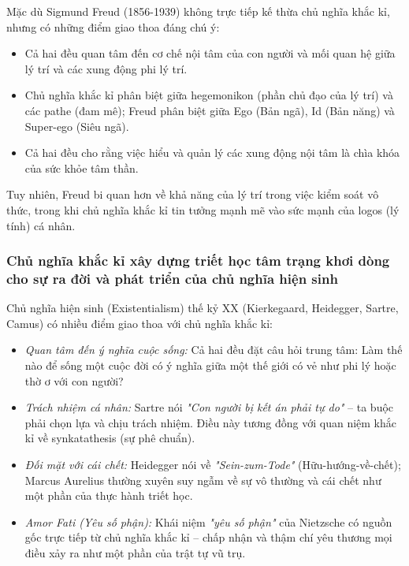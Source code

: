 Mặc dù Sigmund Freud (1856-1939) không trực tiếp kế thừa chủ nghĩa khắc kỉ, nhưng có những điểm giao thoa đáng chú ý:

\begin{itemize}[leftmargin=1.5cm]
    \item Cả hai đều quan tâm đến cơ chế nội tâm của con người và mối quan hệ giữa lý trí và các xung động phi lý trí.
    \item Chủ nghĩa khắc kỉ phân biệt giữa hegemonikon (phần chủ đạo của lý trí) và các pathe (đam mê); Freud phân biệt giữa Ego (Bản ngã), Id (Bản năng) và Super-ego (Siêu ngã).
    \item Cả hai đều cho rằng việc hiểu và quản lý các xung động nội tâm là chìa khóa của sức khỏe tâm thần.
\end{itemize}

Tuy nhiên, Freud bi quan hơn về khả năng của lý trí trong việc kiểm soát vô thức, trong khi chủ nghĩa khắc kỉ tin tưởng mạnh mẽ vào sức mạnh của logos (lý tính) cá nhân.

\subsubsection{Chủ nghĩa khắc kỉ xây dựng triết học tâm trạng khơi dòng cho sự ra đời và phát triển của chủ nghĩa hiện sinh}

Chủ nghĩa hiện sinh (Existentialism) thế kỷ XX (Kierkegaard, Heidegger, Sartre, Camus) có nhiều điểm giao thoa với chủ nghĩa khắc kỉ:

\begin{itemize}[leftmargin=1.5cm]
    \item \textit{Quan tâm đến ý nghĩa cuộc sống:} Cả hai đều đặt câu hỏi trung tâm: Làm thế nào để sống một cuộc đời có ý nghĩa giữa một thế giới có vẻ như phi lý hoặc thờ ơ với con người?
    
    \item \textit{Trách nhiệm cá nhân:} Sartre nói \textit{"Con người bị kết án phải tự do"} – ta buộc phải chọn lựa và chịu trách nhiệm. Điều này tương đồng với quan niệm khắc kỉ về synkatathesis (sự phê chuẩn).
    
    \item \textit{Đối mặt với cái chết:} Heidegger nói về \textit{"Sein-zum-Tode"} (Hữu-hướng-về-chết); Marcus Aurelius thường xuyên suy ngẫm về sự vô thường và cái chết như một phần của thực hành triết học.
    
    \item \textit{Amor Fati (Yêu số phận):} Khái niệm \textit{"yêu số phận"} của Nietzsche có nguồn gốc trực tiếp từ chủ nghĩa khắc kỉ – chấp nhận và thậm chí yêu thương mọi điều xảy ra như một phần của trật tự vũ trụ.
\end{itemize}

